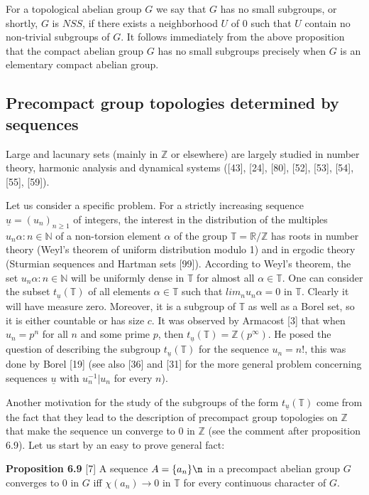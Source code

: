 \documentclass[12pt]{article}
\begin{document}
\begin{itemize}
\begin{itemize}
    For a topological abelian group $G$ we say that $G$ has no small subgroups, or shortly, $G$ is $NSS$, if there exists
a neighborhood $U$ of 0 such that $U$ contain no non-trivial subgroups of $G$. It follows immediately from the
above proposition that the compact abelian group $G$ has no small subgroups precisely when $G$ is an elementary
compact abelian group.


\subsection{Precompact group topologies determined by sequences}
Large and lacunary sets (mainly in $\mathbb{Z}$ or elsewhere) are largely studied in number theory, harmonic analysis and
dynamical systems ([43], [24], [80], [52], [53], [54], [55], [59]).


    Let us consider a specific problem. For a strictly increasing sequence $\underline{u} = (u_n)_{n \geq 1}$ of integers, the interest in
the distribution of the multiples ${u_n \alpha : n \in \mathbb{N}}$ of a non-torsion element $\alpha$ of the group $\mathbb{T} = \mathbb{R}/\mathbb{Z}$ has roots in
number theory (Weyl's theorem of uniform distribution modulo 1) and in ergodic theory (Sturmian sequences
and Hartman sets [99]). According to Weyl's theorem, the set ${u_n \alpha : n \in \mathbb{N}}$ will be uniformly dense in $\mathbb{T}$ for
almost all $\alpha \in \mathbb{T}$. One can consider the subset $t_{\underline{u}}(\mathbb{T})$ of all elements $\alpha \in \mathbb{T}$ such that $lim_n u_n \alpha = 0$ in $\mathbb{T}$. Clearly
it will have measure zero. Moreover, it is a subgroup of $\mathbb{T}$ as well as a Borel set, so it is either countable or has
size $c$. It was observed by Armacost [3] that when $u_n = p^n$ for all $n$ and some prime $p$, then $t_{\underline{u}}(\mathbb{T}) = \mathbb{Z}(p^{\infty})$.
He posed the question of describing the subgroup $t_{\underline{u}}(\mathbb{T})$ for the sequence $u_n = n!$, this was done by Borel [19]
(see also [36] and [31] for the more general problem concerning sequences $\underline{u}$ with $u_n^{-1}|u_n$ for every $n$).


    Another motivation for the study of the subgroups of the form $t_{\underline{u}}(\mathbb{T})$ come from the fact that they lead to
the description of precompact group topologies on $\mathbb{Z}$ that make the sequence un converge to 0 in $\mathbb{Z}$ (see the
comment after proposition 6.9). Let us start by an easy to prove general fact:


\textbf{Proposition 6.9} [7] A sequence $A = \{a_n\}\n$ in a precompact abelian group $G$ converges to 0 in $G$ iff $\chi(a_n) \to 0$
in $\mathbb{T}$ for every continuous character of $G$.



\end{itemize}
\end{itemize}
\end{document}
